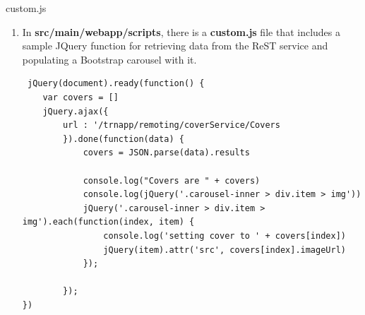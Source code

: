 \documentclass[xcolor=dvipsnames,14pt,professionalfonts]{beamer}
\begin{document}
 \begin{frame}[fragile]{custom.js}
  \begin{enumerate}
    \item In \textbf{src/main/webapp/scripts}, there is a
      \textbf{custom.js} file that includes a sample JQuery function
      for retrieving data from the ReST service and populating a
      Bootstrap carousel with it.
    \begin{verbatim}
 jQuery(document).ready(function() {
    var covers = []
    jQuery.ajax({
        url : '/trnapp/remoting/coverService/Covers
        }).done(function(data) {
            covers = JSON.parse(data).results

            console.log("Covers are " + covers)
            console.log(jQuery('.carousel-inner > div.item > img'))
            jQuery('.carousel-inner > div.item > img').each(function(index, item) {
                console.log('setting cover to ' + covers[index])
                jQuery(item).attr('src', covers[index].imageUrl)
            });    

        });        
})
          \end{verbatim}
    \end{enumerate}
\end{frame}
\end{document}

